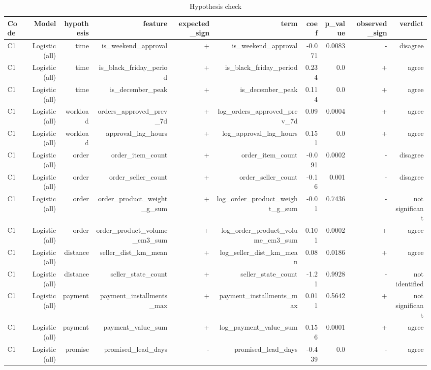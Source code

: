 \begin{table}[htbp]
\centering
\small
\caption{Hypothesis check}
\begin{tabular}{lrrrrrrrrr}
\toprule
Code & Model & hypothesis & feature & expected\_sign & term & coef & p\_value & observed\_sign & verdict \\
\midrule
C1 & Logistic (all) & time & is\_weekend\_approval & + & is\_weekend\_approval & -0.071 & 0.0083 & - & disagree \\
C1 & Logistic (all) & time & is\_black\_friday\_period & + & is\_black\_friday\_period & 0.234 & 0.0 & + & agree \\
C1 & Logistic (all) & time & is\_december\_peak & + & is\_december\_peak & 0.114 & 0.0 & + & agree \\
C1 & Logistic (all) & workload & orders\_approved\_prev\_7d & + & log\_orders\_approved\_prev\_7d & 0.09 & 0.0004 & + & agree \\
C1 & Logistic (all) & workload & approval\_lag\_hours & + & log\_approval\_lag\_hours & 0.151 & 0.0 & + & agree \\
C1 & Logistic (all) & order & order\_item\_count & + & order\_item\_count & -0.091 & 0.0002 & - & disagree \\
C1 & Logistic (all) & order & order\_seller\_count & + & order\_seller\_count & -0.16 & 0.001 & - & disagree \\
C1 & Logistic (all) & order & order\_product\_weight\_g\_sum & + & log\_order\_product\_weight\_g\_sum & -0.01 & 0.7436 & - & not significant \\
C1 & Logistic (all) & order & order\_product\_volume\_cm3\_sum & + & log\_order\_product\_volume\_cm3\_sum & 0.101 & 0.0002 & + & agree \\
C1 & Logistic (all) & distance & seller\_dist\_km\_mean & + & log\_seller\_dist\_km\_mean & 0.08 & 0.0186 & + & agree \\
C1 & Logistic (all) & distance & seller\_state\_count & + & seller\_state\_count & -1.21 & 0.9928 & - & not identified \\
C1 & Logistic (all) & payment & payment\_installments\_max & + & payment\_installments\_max & 0.011 & 0.5642 & + & not significant \\
C1 & Logistic (all) & payment & payment\_value\_sum & + & log\_payment\_value\_sum & 0.156 & 0.0001 & + & agree \\
C1 & Logistic (all) & promise & promised\_lead\_days & - & promised\_lead\_days & -0.439 & 0.0 & - & agree \\

\end{tabular}
\end{table}
